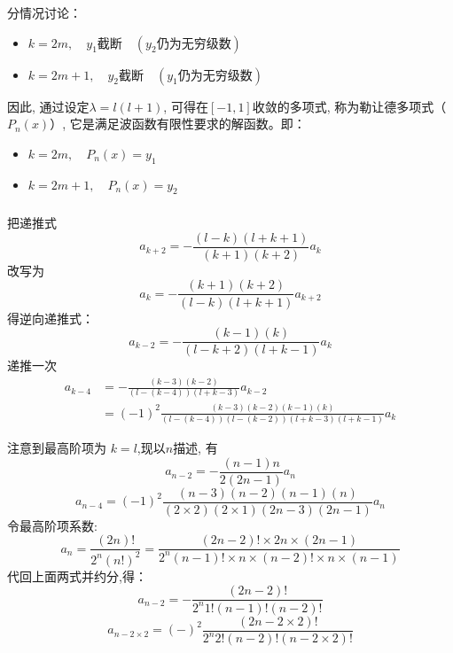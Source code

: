 \begin{frame}
\frametitle{}
分情况讨论：
\begin{itemize}
  \item $k = 2m, \quad y_{1} \text{截断}\quad(y_2\text{仍为无穷级数})$
  \item $k = 2m+1, \quad y_{2} \text{截断}\quad(y_1\text{仍为无穷级数})$
\end{itemize}
因此, 通过设定$\lambda = l(l+1)$, 可得在$[-1, 1]$收敛的多项式, 称为勒让德多项式（$P_n(x)$）, 它是满足波函数有限性要求的解函数。即：
\begin{itemize}
\item $k = 2m, \quad P_n(x)=y_1 $
\item $k = 2m+1, \quad P_n(x)=y_2 $
\end{itemize}
\end{frame} 

\begin{frame}
\frametitle{}
把递推式
\begin{equation*}
  a_{k+2}=-\frac{(l-k)(l+k+1)}{(k+1)(k+2) }a_{k}
\end{equation*}
改写为 
\begin{equation*}
  a_{k}=-\frac{(k+1)(k+2) }{(l-k)(l+k+1)}a_{k+2}
\end{equation*}	
得逆向递推式：
\begin{equation*}
  a_{k-2}=-\frac{(k-1)(k) }{(l-k+2)(l+k-1)}a_{k}
\end{equation*}	
递推一次
\begin{equation*}
  \begin{aligned}
    a_{k-4}&=-\frac{(k-3)(k-2)}{(l-(k-4))(l+k-3)}a_{k-2} \\ 
    &= (-1)^2\frac{(k-3)(k-2)(k-1)(k)}{(l-(k-4))(l-(k-2))(l+k-3)(l+k-1)}a_{k}
  \end{aligned}
\end{equation*}
\end{frame}	

\begin{frame}
注意到最高阶项为 $k=l$,现以$n$描述, 有 
\begin{equation*}
  a_{n-2}=-\frac{(n-1) n}{2(2n-1)} a_{n}
\end{equation*}	
\begin{equation*}
  a_{n-4}=(-1)^2\frac{(n-3)(n-2)(n-1)(n)}{(2\times 2)(2\times 1)(2n-3)(2n-1)}a_{n}
\end{equation*}
令最高阶项系数: \[a_n=\frac{(2n)!}{2^n (n!)^2} = \frac{(2n-2)!\times 2n \times (2n-1)}{2^n (n-1)!\times n \times (n-2)!\times n \times (n-1)  } \]
代回上面两式并约分,得：
\begin{equation*}
  a_{n-2}=-\frac{(2 n-2) !}{2^{n} 1! (n-1) !(n-2) !}
\end{equation*}	
\begin{equation*}
  a_{n-2\times2}=(-)^2\frac{(2 n-2\times2) !}{2^{n} 2! (n-2) !(n-2\times2) !}
\end{equation*}	
\end{frame}	

